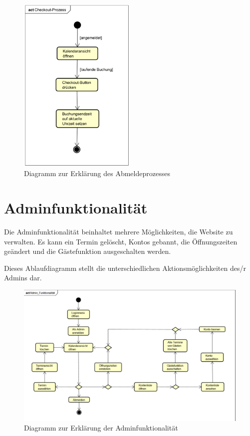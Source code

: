 \begin{figure}[ht]
    \centering
    \includegraphics[width=0.5\textwidth]{figures/activity/checkoutprozess}
    \caption{Diagramm zur Erklärung des Abmeldeprozesses}
    \label{fig:logout-diagram}
\end{figure}

\clearpage

\section{Adminfunktionalität}

Die Adminfunktionalität beinhaltet mehrere Möglichkeiten, die Website zu verwalten.
Es kann ein Termin gelöscht, Kontos gebannt, die Öffnungszeiten geändert und die Gästefunktion
ausgeschalten werden.

Dieses Ablaufdiagramm stellt die unterschiedlichen Aktionsmöglichkeiten des/r Admins dar.

\begin{figure}[ht]
    \centering
    \includegraphics[width=\textwidth]{figures/activity/adminfunk}
    \caption{Diagramm zur Erklärung der Adminfunktionalität}
    \label{fig:admin-functions-diagram}
\end{figure}
\clearpage
